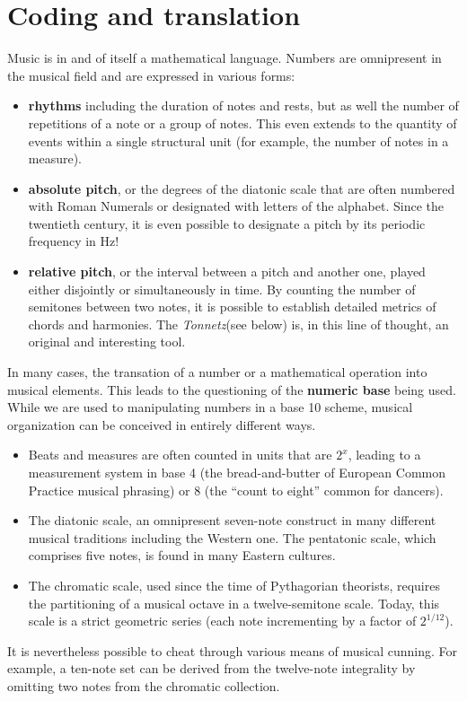 \documentclass{article}
\newcommand{\Tonnetz}{\emph{Tonnetz}}
\begin{document}
\section*{Coding and translation}
Music is in and of itself a mathematical language. Numbers are omnipresent in the musical field and are expressed in various forms:

\begin{itemize}
\item \textbf{rhythms} including the duration of notes and rests, but as
well the number of repetitions of a note or a group of notes.  This even
extends to the quantity of events within a single structural unit (for
example, the number of notes in a measure).
\item \textbf{absolute pitch}, or the degrees of the diatonic scale that are
often numbered with Roman Numerals or designated with letters of the
alphabet. Since the twentieth century, it is even possible to designate a
pitch by its periodic frequency in Hz!
\item \textbf{relative pitch}, or the interval between a pitch and another
one, played either disjointly or simultaneously in time. By counting the
number of semitones between two notes, it is possible to establish detailed
metrics of chords and harmonies. The \Tonnetz (see below) is, in this
line of thought, an original and interesting tool.
\end{itemize}
In many cases, the transation of a number or a mathematical operation
into musical elements.  This leads to the questioning of the \textbf{numeric
base} being used.  While we are used to manipulating numbers in a base 10
scheme, musical organization can be conceived in entirely different ways.
\begin{itemize}
\item Beats and measures are often counted in units that are $2^x$, leading
to a measurement system in base 4 (the bread-and-butter of European Common Practice
musical phrasing) or 8 (the ``count to eight'' common for dancers).
\item The diatonic scale, an omnipresent seven-note construct in many different musical
traditions including the Western one. The pentatonic scale, which comprises
five notes, is found in many Eastern cultures.
\item The chromatic scale, used since the time of Pythagorian theorists,
requires the partitioning of a musical octave in a twelve-semitone scale.
Today, this scale is a strict geometric series (each note incrementing by a
factor of $2^{1/12}$).
\end{itemize}
It is nevertheless possible to cheat through various means of musical
cunning.  For example, a ten-note set can be derived from the twelve-note
integrality by omitting two notes from the chromatic collection.
\end{document}
